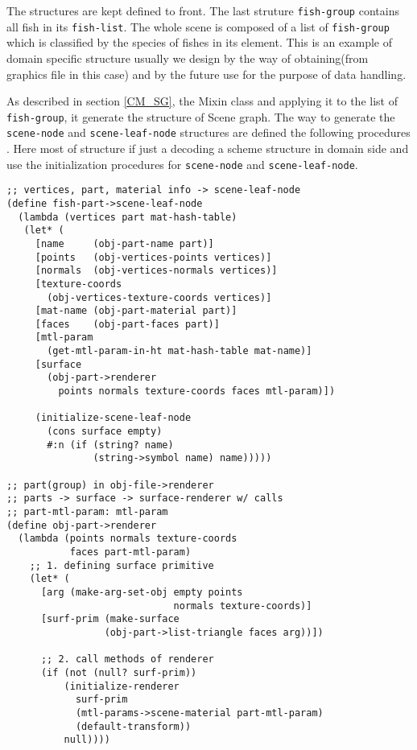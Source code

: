 \documentclass[preprint,nocopyrightspace]{sigplanconf}
\begin{document}
The structures are kept defined to front. The last struture \texttt{fish-group} contains all fish in its \texttt{fish-list}. The whole scene is composed of a list of \texttt{fish-group} which is classified by the species of fishes in its element. This is an example of domain specific structure usually we design by the way of obtaining(from graphics file in this case) and by the future use for the purpose of data handling. 

As described in section \ref{CM_SG}, the Mixin class and applying it to the list of \texttt{fish-group}, it generate the structure of Scene graph. The way to generate the \texttt{scene-node} and \texttt{scene-leaf-node} structures are defined the following procedures . Here most of structure if just a decoding a scheme structure in domain side and use the initialization procedures for \texttt{scene-node} and \texttt{scene-leaf-node}. 


{\small
\begin{verbatim}
;; vertices, part, material info -> scene-leaf-node
(define fish-part->scene-leaf-node 
  (lambda (vertices part mat-hash-table)
   (let* (
     [name     (obj-part-name part)]
     [points   (obj-vertices-points vertices)]
     [normals  (obj-vertices-normals vertices)]
     [texture-coords 
       (obj-vertices-texture-coords vertices)]
     [mat-name (obj-part-material part)]
     [faces    (obj-part-faces part)]
     [mtl-param 
       (get-mtl-param-in-ht mat-hash-table mat-name)]
     [surface 
       (obj-part->renderer 
         points normals texture-coords faces mtl-param)])

     (initialize-scene-leaf-node 
       (cons surface empty)
       #:n (if (string? name) 
               (string->symbol name) name)))))

;; part(group) in obj-file->renderer
;; parts -> surface -> surface-renderer w/ calls
;; part-mtl-param: mtl-param
(define obj-part->renderer 
  (lambda (points normals texture-coords 
           faces part-mtl-param)
    ;; 1. defining surface primitive
    (let* (
      [arg (make-arg-set-obj empty points 
                             normals texture-coords)]
      [surf-prim (make-surface 
                 (obj-part->list-triangle faces arg))])
      
      ;; 2. call methods of renderer 
      (if (not (null? surf-prim))
          (initialize-renderer 
            surf-prim
            (mtl-params->scene-material part-mtl-param)
            (default-transform))
          null))))
\end{verbatim}
}
\end{document}
